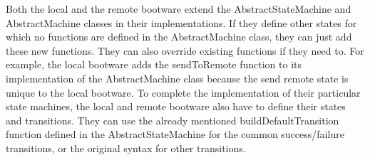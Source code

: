 \vspace*{\baselineskip}

Both the local and the remote bootware extend the AbstractStateMachine and AbstractMachine classes in their implementations.
If they define other states for which no functions are defined in the AbstractMachine class, they can just add these new functions.
They can also override existing functions if they need to.
For example, the local bootware adds the sendToRemote function to its implementation of the AbstractMachine class because the send remote state is unique to the local bootware.
To complete the implementation of their particular state machines, the local and remote bootware also have to define their states and transitions.
They can use the already mentioned buildDefaultTransition function defined in the AbstractStateMachine for the common success/failure transitions, or the original syntax for other transitions.
